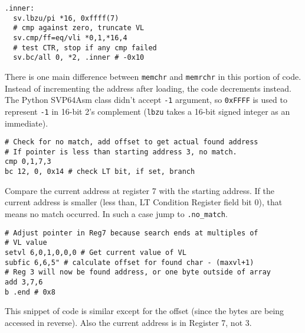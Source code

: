 \begin{verbatim}
.inner:
  sv.lbzu/pi *16, 0xffff(7)
  # cmp against zero, truncate VL
  sv.cmp/ff=eq/vli *0,1,*16,4
  # test CTR, stop if any cmp failed
  sv.bc/all 0, *2, .inner # -0x10
\end{verbatim}
There is one main difference between \texttt{memchr} and \texttt{memrchr} in
this portion of code. Instead of incrementing the address after loading,
the code decrements instead. The Python SVP64Asm class didn't accept
\texttt{-1} argument, so \texttt{0xFFFF} is used to represent \texttt{-1}
in 16-bit 2's complement (\texttt{lbzu} takes a 16-bit signed integer
as an immediate).

\begin{verbatim}
# Check for no match, add offset to get actual found address
# If pointer is less than starting address 3, no match.
cmp 0,1,7,3
bc 12, 0, 0x14 # check LT bit, if set, branch
\end{verbatim}

Compare the current address at register 7 with the starting address.
If the current address is smaller (less than,
LT Condition Register field bit 0), that means no match occurred.
In such a case jump to \texttt{.no\_match}.

\begin{verbatim}
# Adjust pointer in Reg7 because search ends at multiples of
# VL value
setvl 6,0,1,0,0,0 # Get current value of VL
subfic 6,6,5" # calculate offset for found char - (maxvl+1)
# Reg 3 will now be found address, or one byte outside of array
add 3,7,6
b .end # 0x8
\end{verbatim}
This snippet of code is similar except for the offset (since the bytes are
being accessed in reverse). Also the current address is in Register 7, not 3.

